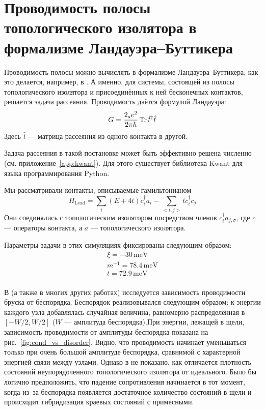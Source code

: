 \section{Проводимость полосы топологического изолятора
         в формализме Ландауэра--Буттикера}
Проводимость полосы можно вычислять в формализме Ландауэра--Буттикера, как
это делается, например, в \cite{Li2009}. А именно, для системы, состоящей
из полосы топологического изолятора и присоединённых к ней бесконечных
контактов, решается задача рассеяния. Проводимость даётся формулой
Ландауэра:
\begin{equation}
    G = \frac{2_se^2}{2\pi \hbar} \operatorname{Tr}{\hat{t}^\dagger \hat{t}}
\end{equation}
Здесь $\hat{t}$ --- матрица рассеяния из одного контакта в другой. 

Задача рассеяния в такой постановке может быть эффективно решена численно
(см. приложение~\ref{app:kwant}). Для этого существует библиотека Kwant 
\cite{Groth2014} для языка программирования Python.

Мы рассматривали контакты, описываемые гамильтонианом
\begin{equation}
    H_{\mathrm{Lead}} = \sum_i (E + 4t)c_{i}^\dagger a_{i} - \sum_{<i,j>} t c_{i}^\dagger c_{j}
\end{equation}
Они соединялись с топологическим изолятором посредством членов $c_i^\dagger a_{j,\sigma}$, 
где $c$ --- операторы контакта, а $a$ --- топологического изолятора.

Параметры задачи в этих симуляциях фиксированы следующим образом:
\begin{equation}
    \begin{gathered}
        \xi = -30\,\mathrm{meV}\\
        m^{-1} = 78.4\, \mathrm{meV}\\
        t = 72.9\, \mathrm{meV}\\
    \end{gathered}
\end{equation}

В \cite{Li2009} (а также в многих других работах) исследуется зависимость проводимости 
бруска от беспорядка. Беспорядок реализовывался следующим образом:
к энергии каждого узла добавлялась случайная величина, равномерно распределённая в 
$[-W/2, W/2]$ ($W$ --- амплитуда беспорядка).При энергии, лежащей в щели, зависимость 
проводимости от амплитуды
беспорядка показана на рис.~\ref{fig:cond_vs_disorder}. Видно, что проводимость начинает 
уменьшаться только при очень большой амплитуде беспорядка,
сравнимой с характерной энергией связи между узлами. Однако в \cite{Li2009} не показано,
как отличается плотность состояний неупорядоченного топологического изолятора от идеального. 
Было бы логично предположить, что падение сопротивления начинается в тот момент, когда
из--за беспорядка появляется достаточное количество состояний в щели и происходит гибридизация
краевых состояний с примесными.

